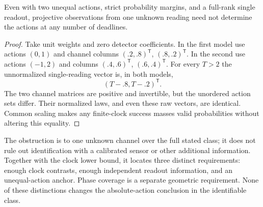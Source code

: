 \begin{proposition}
\label{prop:v83-one-view}
Even with two unequal actions, strict probability margins, and a
full-rank single readout, projective observations from one unknown
reading need not determine the actions at any number of deadlines.
\end{proposition}
\begin{proof}
Take unit weights and zero detector coefficients. In the first model
use actions $(0,1)$ and channel columns $(.2,.8)^{\mathsf T}$,
$(.8,.2)^{\mathsf T}$. In the second use actions $(-1,2)$ and
columns $(.4,.6)^{\mathsf T}$, $(.6,.4)^{\mathsf T}$.
For every $T>2$ the unnormalized single-reading vector is, in both
models,
\[
                       (T-.8,T-.2)^{\mathsf T}.
\]
The two channel matrices are positive and invertible, but the unordered
action sets differ. Their normalized laws, and even these raw vectors,
are identical. Common scaling makes any finite-clock success masses
valid probabilities without altering this equality.
\end{proof}

The obstruction is to one unknown channel over the full stated class;
it does not rule out identification with a calibrated sensor or other
additional information. Together with the clock lower bound, it locates
three distinct requirements: enough clock contrasts, enough independent
readout information, and an unequal-action anchor. Phase coverage is a
separate geometric requirement. None of these distinctions changes the
absolute-action conclusion in the identifiable class.

